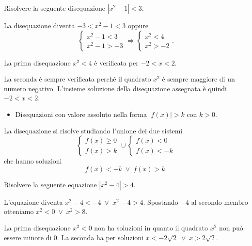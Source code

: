 \begin{exrig}
\begin{esempio}
Risolvere la seguente disequazione $\left|x^2-1\right|<3$.

La disequazione diventa $-3<x^2-1<3$ oppure 
\[\left\{\begin{array}{l}{x^2-1<3}\\{x^2-1>-3}\end{array}\right.\Rightarrow \left\{\begin{array}{l}{x^2<4}\\{x^2>-2}\end{array}\right..\]

La prima disequazione $x^2<4$ è verificata per $-2<x<2$.

La seconda è sempre verificata perché il quadrato $x^2$ è sempre maggiore di un numero negativo.
L'insieme soluzione della disequazione assegnata è quindi $-2<x<2$.

\end{esempio}
\end{exrig}

\begin{itemize}
\item Disequazioni con valore assoluto nella forma $\left|f(x)\right|>k \text{ con } k>0 $.
\end{itemize}

La disequazione si risolve studiando l'unione dei due sistemi 
\[\left\{\begin{array}{l}{f(x)\ge 0}\\{f(x)>k}\end{array}\right.\cup\left\{\begin{array}{l}{f(x)< 0}\\{f(x)<-k}\end{array}\right.\]
che hanno soluzioni \[ f(x)<-k\;\vee\; f(x)>k. \]



\begin{exrig}
\begin{esempio}
Risolvere la seguente equazione $\left|x^2-4\right|>4$.

L'equazione diventa $x^2-4<-4\;\vee\; x^2-4>4$. Spostando $-4$ al secondo membro otteniamo $x^2<0\;\vee\; x^2>8$.

La prima disequazione $x^2<0$ non ha soluzioni in quanto il quadrato $x^2$ non può essere minore di 0.
La seconda ha per soluzioni $x<-2\sqrt 2\;\vee\; x>2\sqrt 2$.
\end{esempio}
\end{exrig}

